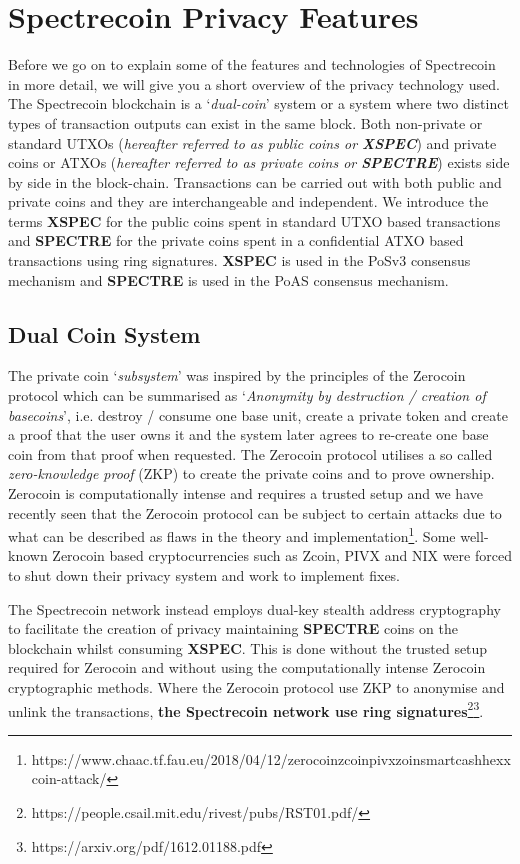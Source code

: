 \section{Spectrecoin Privacy Features}
Before we go on to explain some of the features and technologies of
Spectrecoin in more detail, we will give you a short overview of the
privacy technology used. The Spectrecoin blockchain is a ‘\textit{dual-coin}’
system or a system where two distinct types of transaction outputs can
exist in the same block. Both non-private or standard UTXOs (\textit{hereafter
referred to as public coins or \textbf{XSPEC}}) and private coins or ATXOs 
(\textit{hereafter referred to as private coins or \textbf{SPECTRE}}) exists 
side by side in the block-chain. Transactions can be carried out with both 
public and private coins and they are interchangeable and independent. We 
introduce the terms \textbf{XSPEC} for the public coins spent in standard UTXO based 
transactions and \textbf{SPECTRE} for the private coins spent in a confidential ATXO based
transactions using ring signatures. \textbf{XSPEC} is used in the PoSv3 consensus
mechanism and \textbf{SPECTRE} is used in the PoAS consensus mechanism.



\subsection{Dual Coin System}
The private coin ‘\textit{subsystem}’ was inspired by the principles of the Zerocoin
protocol which can be summarised as ‘\textit{Anonymity by destruction / creation of
basecoins}’, i.e. destroy / consume one base unit, create a private token
and create a proof that the user owns it and the system later agrees to
re-create one base coin from that proof when requested. The Zerocoin protocol
utilises a so called \textit{zero-knowledge proof} (ZKP) to create the private coins
and to prove ownership. Zerocoin is computationally intense and requires a
trusted setup and we have recently seen that the Zerocoin protocol can be
subject to certain attacks due to what can be described as flaws in the
theory and 
implementation\footnote{https://www.chaac.tf.fau.eu/2018/04/12/zerocoinzcoinpivxzoinsmartcashhexxcoin-attack/}. 
Some well-known Zerocoin based cryptocurrencies
such as Zcoin, PIVX and NIX were forced to shut down their privacy system and
work to implement fixes.



The Spectrecoin network instead employs dual-key stealth address cryptography
to facilitate the creation of privacy maintaining \textbf{SPECTRE} coins on the
blockchain whilst consuming \textbf{XSPEC}. This is done without the trusted setup
required for Zerocoin and without using the computationally intense Zerocoin
cryptographic methods. Where the Zerocoin protocol use ZKP to anonymise and
unlink the transactions, 
\textbf{the Spectrecoin network use ring signatures}\footnote{https://people.csail.mit.edu/rivest/pubs/RST01.pdf/}\footnote{https://arxiv.org/pdf/1612.01188.pdf}.



